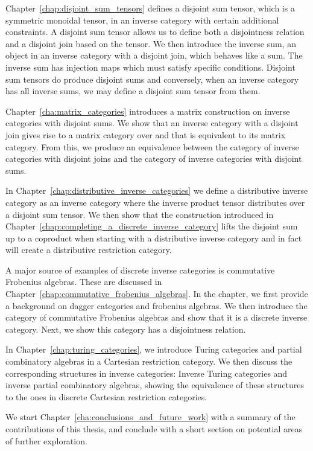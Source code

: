 Chapter~\ref{chap:disjoint_sum_tensors} defines a disjoint sum tensor, which is a  symmetric monoidal
tensor, in an inverse category with certain additional constraints. A disjoint sum tensor allows us
to define both a disjointness relation and a disjoint join based on the tensor. We then introduce
the inverse sum, an object in an inverse category with a disjoint join, which behaves like a
sum. The inverse sum has injection maps which must satisfy specific conditions. Disjoint sum
tensors do produce disjoint sums and conversely, when an inverse category has all inverse sums, we
may define a disjoint sum tensor from them.


Chapter~\ref{cha:matrix_categories} introduces a matrix construction on inverse categories with
disjoint sums. We show that an inverse category \X with a disjoint join
gives rise to a matrix category over \X and that \X is equivalent to its matrix category. From this,
we produce an equivalence between the category of inverse categories with disjoint joins and the
category of inverse categories with disjoint sums.

In Chapter~\ref{chap:distributive_inverse_categories} we define a distributive inverse category as
an inverse category where the inverse product tensor distributes over a disjoint sum tensor. We
then show that the construction introduced in
Chapter~\ref{chap:completing_a_discrete_inverse_category} lifts the disjoint sum up to a coproduct
when starting with a distributive inverse category and in fact will create a distributive
restriction category.

A major source of examples of discrete inverse
categories is commutative Frobenius algebras. These are discussed in
Chapter~\ref{chap:commutative_frobenius_algebras}. In the chapter, we first provide
a background on dagger categories and frobenius algebras. We then introduce the category of
commutative Frobenius algebras and show that it is a discrete inverse category. Next, we show this
category has a disjointness relation.

In Chapter~\ref{chap:turing_categories}, we introduce Turing categories and partial combinatory
algebras in a Cartesian restriction category. We then discuss the corresponding structures in
inverse categories: Inverse Turing categories and inverse partial combinatory algebras, showing the
equivalence of these structures to the ones in discrete Cartesian restriction categories.

We start Chapter~\ref{cha:conclusions_and_future_work} with a summary of the contributions of this
thesis, and conclude with a short section on potential areas of further exploration.



